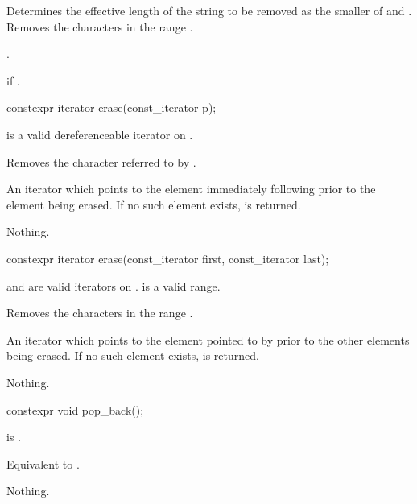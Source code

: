 \begin{itemdescr}
\pnum
\effects
Determines the effective length 
of the string to be removed as the smaller of  and
.
Removes the characters in the range .

\pnum
\returns
{}.

\pnum
\throws
{}
if 
.
\end{itemdescr}

%
\begin{itemdecl}
constexpr iterator erase(const_iterator p);
\end{itemdecl}

\begin{itemdescr}
\pnum
\expects
{} is a valid dereferenceable iterator on .

\pnum
\effects
Removes the character referred to by .

\pnum
\returns
An iterator which points to the element immediately following  prior to
the element being erased.
If no such element exists,
is returned.

\pnum
\throws
Nothing.
\end{itemdescr}

%
\begin{itemdecl}
constexpr iterator erase(const_iterator first, const_iterator last);
\end{itemdecl}

\begin{itemdescr}
\pnum
\expects
{} and  are valid iterators on
.  is a valid range.

\pnum
\effects
Removes the characters in the range
.

\pnum
\returns
An iterator which points to the element pointed to by  prior to
the other elements being erased.
If no such element exists,
is returned.

\pnum
\throws
Nothing.
\end{itemdescr}

%
\begin{itemdecl}
constexpr void pop_back();
\end{itemdecl}

\begin{itemdescr}
\pnum
\hardexpects
{} is .

\pnum
\effects
Equivalent to .

\pnum
\throws
Nothing.
\end{itemdescr}

